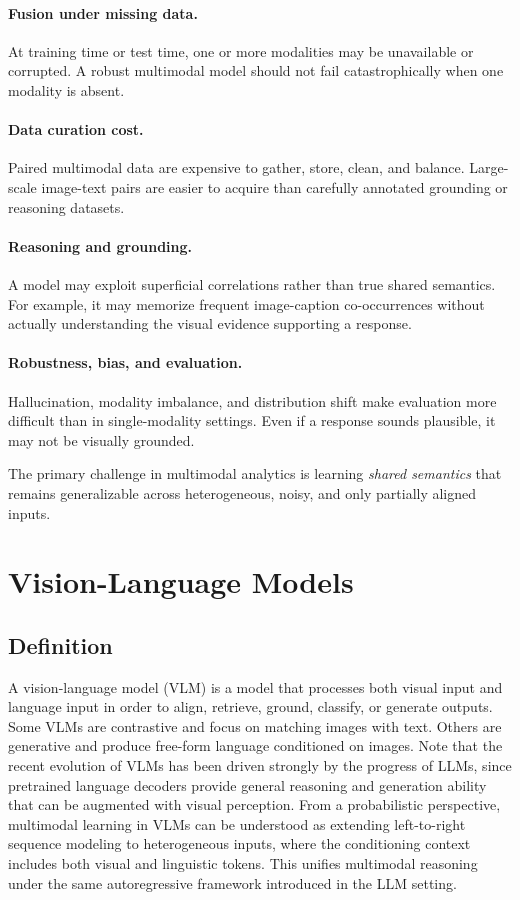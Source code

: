 \documentclass{article}
\begin{document}
\paragraph{Fusion under missing data.} At training time or test time, one or more modalities may be unavailable or corrupted. A robust multimodal model should not fail catastrophically when one modality is absent.

\paragraph{Data curation cost.} Paired multimodal data are expensive to gather, store, clean, and balance. Large-scale image-text pairs are easier to acquire than carefully annotated grounding or reasoning datasets.

\paragraph{Reasoning and grounding.} A model may exploit superficial correlations rather than true shared semantics. For example, it may memorize frequent image-caption co-occurrences without actually understanding the visual evidence supporting a response.

\paragraph{Robustness, bias, and evaluation.} Hallucination, modality imbalance, and distribution shift make evaluation more difficult than in single-modality settings. Even if a response sounds plausible, it may not be visually grounded.

The primary challenge in multimodal analytics is learning \emph{shared semantics} that remains generalizable across heterogeneous, noisy, and only partially aligned inputs.

\section{Vision-Language Models}
\subsection{Definition}
A vision-language model (VLM) is a model that processes both visual input and language input in order to align, retrieve, ground, classify, or generate outputs. Some VLMs are contrastive and focus on matching images with text. Others are generative and produce free-form language conditioned on images. Note that the recent evolution of VLMs has been driven strongly by the progress of LLMs, since pretrained language decoders provide general reasoning and generation ability that can be augmented with visual perception. From a probabilistic perspective, multimodal learning in VLMs can be understood as extending left-to-right sequence modeling to heterogeneous inputs, where the conditioning context includes both visual and linguistic tokens. This unifies multimodal reasoning under the same autoregressive framework introduced in the LLM setting.
\end{document}
